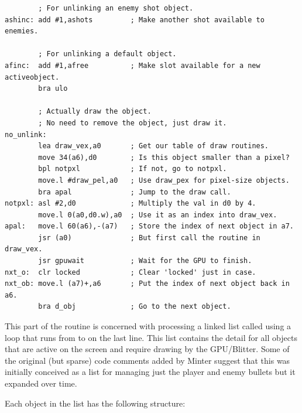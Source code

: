 \begin{lstlisting}
        ; For unlinking an enemy shot object.
ashinc: add #1,ashots         ; Make another shot available to enemies.
    
        ; For unlinking a default object.
afinc:  add #1,afree          ; Make slot available for a new activeobject.
        bra ulo
    
        ; Actually draw the object.
        ; No need to remove the object, just draw it.
no_unlink:
        lea draw_vex,a0       ; Get our table of draw routines.
        move 34(a6),d0        ; Is this object smaller than a pixel?
        bpl notpxl            ; If not, go to notpxl.
        move.l #draw_pel,a0   ; Use draw_pex for pixel-size objects.
        bra apal              ; Jump to the draw call.
notpxl: asl #2,d0             ; Multiply the val in d0 by 4.
        move.l 0(a0,d0.w),a0  ; Use it as an index into draw_vex.
apal:   move.l 60(a6),-(a7)   ; Store the index of next object in a7.
        jsr (a0)              ; But first call the routine in draw_vex.
        jsr gpuwait           ; Wait for the GPU to finish.
nxt_o:  clr locked            ; Clear 'locked' just in case.
nxt_ob: move.l (a7)+,a6       ; Put the index of next object back in a6.
        bra d_obj             ; Go to the next object.
\end{lstlisting}

This part of the  routine is concerned with processing a linked list called
 using a loop that runs from  to  on the
last line. This  list contains the detail for all objects that
are active on the screen and require drawing by the GPU/Blitter. Some of the original (but sparse)
code comments added by Minter suggest that this was initially conceived as a list for managing just
the player and enemy bullets but it expanded over time. 

Each object in the  list has the following structure:

